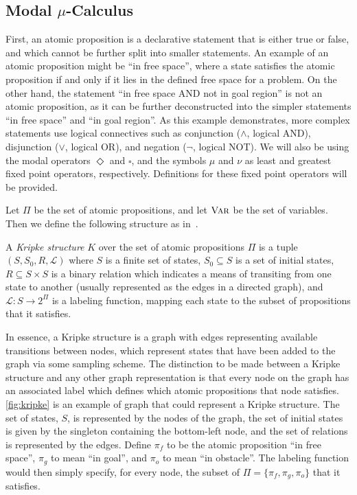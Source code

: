\subsection{\texorpdfstring{Modal $\mu$-Calculus}{Modal mu-Calculus} }
First, an atomic proposition is a declarative statement that is either true or false, and which cannot be further split into smaller statements. An example of an atomic proposition might be ``in free space'', where a state satisfies the atomic proposition if and only if it lies in the defined free space for a problem. On the other hand, the statement ``in free space AND not in goal region'' is not an atomic proposition, as it can be further deconstructed into the simpler statements ``in free space'' and ``in goal region''. As this example demonstrates, more complex statements use logical connectives such as conjunction ($\land$, logical AND), disjunction ($\lor$, logical OR), and negation ($\lnot$, logical NOT). We will also be using the modal operators $\Diamond$ and $\square$, and the symbols $\mu$ and $\nu$ as least and greatest fixed point operators, respectively. Definitions for these fixed point operators will be provided.

Let $\Pi$ be the set of atomic propositions, and let $\textsc{Var}$ be the set of variables. Then we define the following structure as in~\cite{Karaman2009}.
\begin{defn}\label{defn:kripke}
    A \emph{Kripke structure} $K$ over the set of atomic propositions $\Pi$ is a tuple $(S,S_0,R,\mathcal{L})$ where $S$ is a finite set of states, $S_0 \subseteq S$ is a set of initial states,  $R \subseteq S \times S$ is a binary relation which indicates a means of transiting from one state to another (usually represented as the edges in a directed graph), and $\mathcal{L}:S \to 2^\Pi$ is a labeling function, mapping each state to the subset of propositions that it satisfies.
\end{defn}

In essence, a Kripke structure is a graph with edges representing available transitions between nodes, which represent states that have been added to the graph via some sampling scheme. The distinction to be made between a Kripke structure and any other graph representation is that every node on the graph has an associated label which defines which atomic propositions that node satisfies. \autoref{fig:kripke} is an example of graph that could represent a Kripke structure.
The set of states, $S$, is represented by the nodes of the graph, the set of initial states is given by the singleton containing the bottom-left node, and the set of relations is represented by the edges. Define $\pi_f$ to be the atomic proposition ``in free space'', $\pi_g$ to mean ``in goal'', and $\pi_o$ to mean ``in obstacle''. The labeling function would then simply specify, for every node, the subset of $\Pi = \{ \pi_f, \pi_g, \pi_o \}$ that it satisfies.

